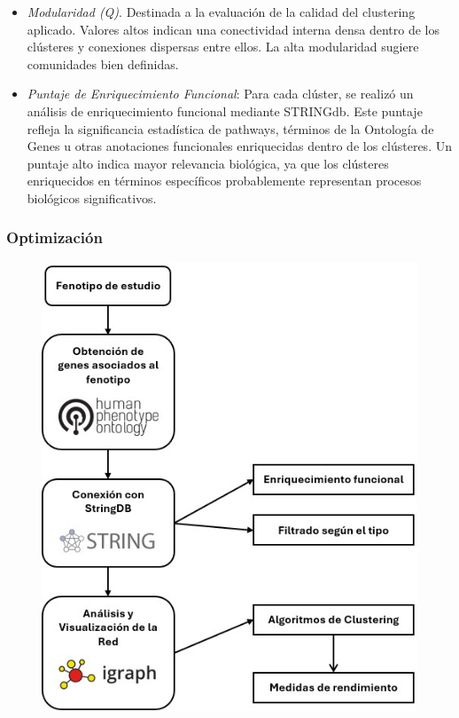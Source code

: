 \begin{itemize}
	\item \textit{Modularidad (Q)}. Destinada a la evaluación de la calidad del clustering aplicado. Valores altos indican una conectividad interna densa dentro de los clústeres y conexiones dispersas entre ellos. La alta modularidad sugiere comunidades bien definidas.
	
	\item \textit{Puntaje de Enriquecimiento Funcional}: Para cada clúster, se realizó un análisis de enriquecimiento funcional mediante STRINGdb. Este puntaje refleja la significancia estadística de pathways, términos de la Ontología de Genes u otras anotaciones funcionales enriquecidas dentro de los clústeres. Un puntaje alto indica mayor relevancia biológica, ya que los clústeres enriquecidos en términos específicos probablemente representan procesos biológicos significativos.
\end{itemize}


\subsubsection*{Optimización}

\begin{figure}[h]
	\centering
	\includegraphics[width=0.75\linewidth]{figures/methods/flujo_trabajo.png}
	\caption{}
	\label{fig:flujo_trabajo}
\end{figure}
